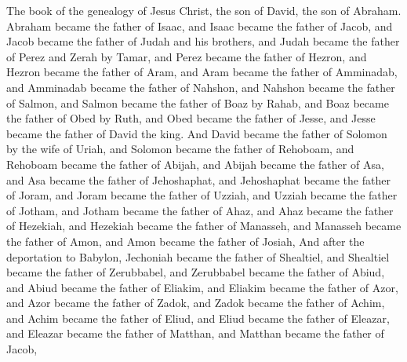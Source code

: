 
\begin{biblechapter} %
 The book of the genealogy of Jesus Christ, the son of David, the son of Abraham.
\verse Abraham became the father of Isaac, and Isaac became the father of Jacob, and Jacob became the father of Judah and his brothers,
\verse and Judah became the father of Perez and Zerah by Tamar, and Perez became the father of Hezron, and Hezron became the father of Aram,
\verse and Aram became the father of Amminadab, and Amminadab became the father of Nahshon, and Nahshon became the father of Salmon,
\verse and Salmon became the father of Boaz by Rahab, and Boaz became the father of Obed by Ruth, and Obed became the father of Jesse,
\verse and Jesse became the father of David the king.
\verse And David became the father of Solomon by the wife of Uriah,
\verse and Solomon became the father of Rehoboam, and Rehoboam became the father of Abijah, and Abijah became the father of Asa,
\verse and Asa became the father of Jehoshaphat, and Jehoshaphat became the father of Joram, and Joram became the father of Uzziah,
\verse and Uzziah became the father of Jotham, and Jotham became the father of Ahaz, and Ahaz became the father of Hezekiah,
\verse and Hezekiah became the father of Manasseh, and Manasseh became the father of Amon, and Amon became the father of Josiah,
\verse And after the deportation to Babylon, Jechoniah became the father of Shealtiel, and Shealtiel became the father of Zerubbabel,
\verse and Zerubbabel became the father of Abiud, and Abiud became the father of Eliakim, and Eliakim became the father of Azor,
\verse and Azor became the father of Zadok, and Zadok became the father of Achim, and Achim became the father of Eliud,
\verse and Eliud became the father of Eleazar, and Eleazar became the father of Matthan, and Matthan became the father of Jacob,

\end{biblechapter}
